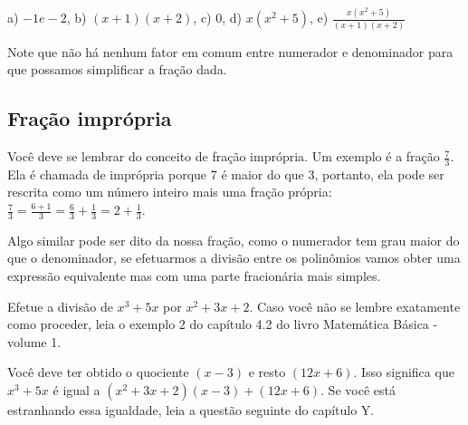 \documentclass[main_estudante.tex]{subfiles}
\begin{document}
\begin{gabarito}
	\begin{gabaritoQuestao}
		a) $-1 e -2$, b) $(x+1)(x+2)$, c) $0$, d) $x(x^2+5)$, e) $\frac{x(x^2+5)}{(x+1)(x+2)}$
	\end{gabaritoQuestao}
\end{gabarito}

Note que não há nenhum fator em comum entre numerador e denominador para que possamos simplificar a fração dada.

\subsection*{Fração imprópria}

Você deve se lembrar do conceito de fração imprópria. Um exemplo é a fração $\frac{7}{3}$. Ela é chamada de imprópria porque 7 é maior do que 3, portanto, ela pode ser rescrita como um número inteiro mais uma fração própria:$\frac{7}{3}=\frac{6+1}{3}=\frac{6}{3}+\frac{1}{3}=2+\frac{1}{3}$.

Algo similar pode ser dito da nossa fração, como o numerador tem grau maior do que o denominador, se efetuarmos a divisão entre os polinômios vamos obter uma expressão equivalente mas com uma parte fracionária mais simples.


\begin{questao}
Efetue a divisão de ${x^3+5x}$ por ${x^2+3x+2}$. Caso você não se lembre exatamente como proceder, leia o exemplo 2 do capítulo 4.2 do livro Matemática Básica - volume 1.
\end{questao}


Você deve ter obtido o quociente $(x-3)$ e resto $(12x+6)$. Isso significa que ${x^3+5x}$ é igual a $(x^2+3x+2)(x-3)+(12x+6)$. Se você está estranhando essa igualdade, leia a questão seguinte do capítulo Y. 
\end{document}

